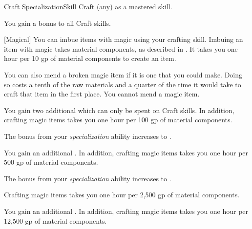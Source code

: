     \begin{feat}{Craft Specialization}{Skill}
        \featpre Craft (any) as a mastered skill.

         You gain a  bonus to all Craft skills.

        [Magical] You can imbue items with magic using your crafting skill.
        Imbuing an item with magic takes material components, as described in .
        It takes you one hour per 10 gp of material components to create an item.

        You can also mend a broken magic item if it is one that you could make.
        Doing so costs a tenth of the raw materials and a quarter of the time it would take to craft that item in the first place.
        You cannot mend a  magic item.

         You gain two additional  which can only be spent on Craft skills.
        In addition, crafting magic items takes you one hour per 100 gp of material components.

         The bonus from your \textit{specialization} ability increases to .

         You gain an additional .
        In addition, crafting magic items takes you one hour per 500 gp of material components.

         The bonus from your \textit{specialization} ability increases to .

        \ff[17]{}
        Crafting magic items takes you one hour per 2,500 gp of material components.

         You gain an additional .
        In addition, crafting magic items takes you one hour per 12,500 gp of material components.
    \end{feat}

